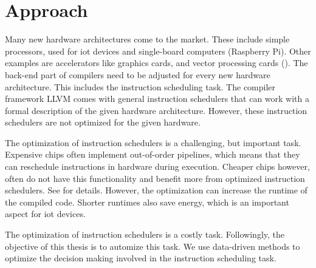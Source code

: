 \chapter{Approach}
\label{sec:approach}

Many new hardware architectures come to the market.
These include simple processors, used for \ac{iot} devices and single-board computers (\eg Raspberry Pi).
Other examples are accelerators like graphics cards, and vector processing cards (\eg \aurora).
The back-end part of compilers need to be adjusted for every new hardware architecture.
This includes the instruction scheduling task.
The compiler framework LLVM comes with general instruction schedulers that can work with a formal description of the given hardware architecture.
However, these instruction schedulers are not optimized for the given hardware.

The optimization of instruction schedulers is a challenging, but important task.
Expensive chips often implement out-of-order pipelines, which means that they can reschedule instructions in hardware during execution.
Cheaper chips however, often do not have this functionality and benefit more from optimized instruction schedulers.
See  for details.
However, the optimization can increase the runtime of the compiled code.
Shorter runtimes also save energy, which is an important aspect for \ac{iot} devices.

The optimization of instruction schedulers is a costly task.
Followingly, the objective of this thesis is to automize this task.
We use data-driven methods to optimize the decision making involved in the instruction scheduling task.

